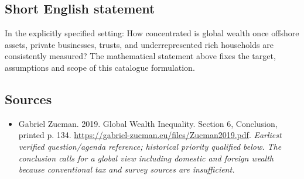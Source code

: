 \documentclass[11pt]{article}
\begin{document}
\subsection{Short English statement}
In the explicitly specified setting: How concentrated is global wealth once offshore assets, private businesses, trusts, and underrepresented rich households are consistently measured? The mathematical statement above fixes the target, assumptions and scope of this catalogue formulation.

\subsection{Sources}
\begin{itemize}\raggedright
\item[\textnormal{[S1]}]\hypertarget{source:30007643:1}{} Gabriel Zucman. 2019. Global Wealth Inequality. Section 6, Conclusion, printed p. 134.
\url{https://gabriel-zucman.eu/files/Zucman2019.pdf}.
{\small\textit{Earliest verified question/agenda reference; historical priority qualified below. The conclusion calls for a global view including domestic and foreign wealth because conventional tax and survey sources are insufficient.}}
\end{itemize}
\end{document}
